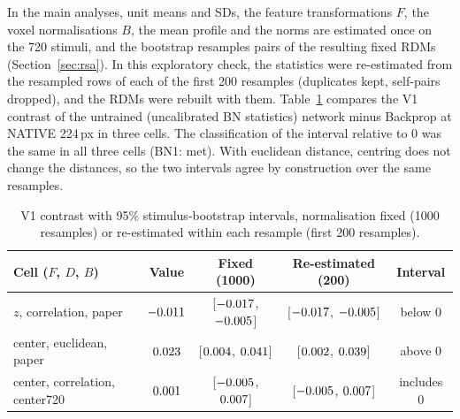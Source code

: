 In the main analyses, unit means and SDs, the feature transformations $F$, the voxel
normalisations $B$, the mean profile and the norms are estimated once on the 720 stimuli,
and the bootstrap resamples pairs of the resulting fixed RDMs (Section~\ref{sec:rsa}). In this
exploratory check, the statistics were re-estimated from the resampled rows of each of the
first 200 resamples (duplicates kept, self-pairs dropped), and the RDMs were rebuilt with
them. Table~\ref{tab:bootnorm} compares the V1 contrast of the untrained (uncalibrated BN
statistics) network minus Backprop at NATIVE 224\,px in three cells. The classification of
the interval relative to 0 was the same in all three cells (BN1: met). With euclidean
distance, centring does not change the distances, so the two intervals agree by construction
over the same resamples.

\begin{table}[H]
\centering
\footnotesize
\setlength{\tabcolsep}{3pt}
\begin{tabular}{@{}lcccc@{}}
\toprule
Cell ($F$, $D$, $B$) & Value & Fixed (1000) & Re-estimated (200) & Interval \\
\midrule
$z$, correlation, paper & $-0.011$ & [$-0.017$, $-0.005$] & [$-0.017$, $-0.005$] & below 0 \\
center, euclidean, paper & $0.023$ & [$0.004$, $0.041$] & [$0.002$, $0.039$] & above 0 \\
center, correlation, center720 & $0.001$ & [$-0.005$, $0.007$] & [$-0.005$, $0.007$] & includes 0 \\
\bottomrule
\end{tabular}
\caption{V1 contrast with 95\% stimulus-bootstrap intervals, normalisation fixed (1000
resamples) or re-estimated within each resample (first 200 resamples).}
\label{tab:bootnorm}
\end{table}

